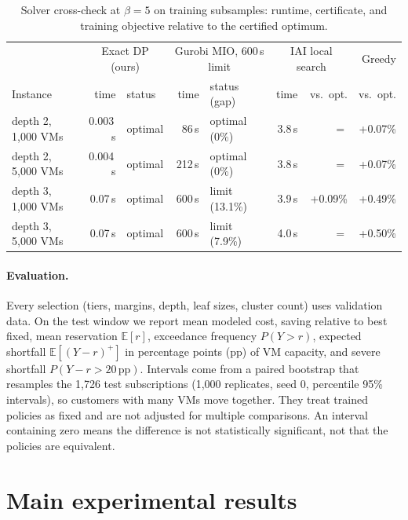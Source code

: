 \documentclass[10pt]{article}
\newcommand{\Ex}{\mathbb{E}}
\newcommand{\pp}{\,\text{pp}}
\begin{document}
\begin{table}[h]
\centering\small
\caption{Solver cross-check at $\beta=5$ on training subsamples: runtime, certificate, and training objective relative to the certified optimum.}
\label{tab:solver}
\setlength{\tabcolsep}{4.5pt}
\begin{tabular}{lrl|rl|rr|r}
\toprule
 & \multicolumn{2}{c|}{Exact DP (ours)} & \multicolumn{2}{c|}{Gurobi MIO, 600\,s limit} & \multicolumn{2}{c|}{IAI local search} & Greedy \\
Instance & time & status & time & status (gap) & time & vs.\ opt. & vs.\ opt. \\
\midrule
depth 2, 1,000 VMs & 0.003\,s & optimal & 86\,s & optimal (0\%) & 3.8\,s & $=$ & +0.07\% \\
depth 2, 5,000 VMs & 0.004\,s & optimal & 212\,s & optimal (0\%) & 3.8\,s & $=$ & +0.07\% \\
depth 3, 1,000 VMs & 0.07\,s & optimal & 600\,s & limit (13.1\%) & 3.9\,s & +0.09\% & +0.49\% \\
depth 3, 5,000 VMs & 0.07\,s & optimal & 600\,s & limit (7.9\%) & 4.0\,s & $=$ & +0.50\% \\
\bottomrule
\end{tabular}
\end{table}

\paragraph{Evaluation.} Every selection (tiers, margins, depth, leaf sizes, cluster count) uses validation data. On the test window we report mean modeled cost, saving relative to best fixed, mean reservation $\Ex[r]$, exceedance frequency $P(Y>r)$, expected shortfall $\Ex[(Y-r)^+]$ in percentage points (pp) of VM capacity, and severe shortfall $P(Y-r>20\pp)$. Intervals come from a paired bootstrap that resamples the 1,726 test subscriptions (1,000 replicates, seed 0, percentile 95\% intervals), so customers with many VMs move together. They treat trained policies as fixed and are not adjusted for multiple comparisons. An interval containing zero means the difference is not statistically significant, not that the policies are equivalent.

\section{Main experimental results}
\label{sec:results}
\end{document}
